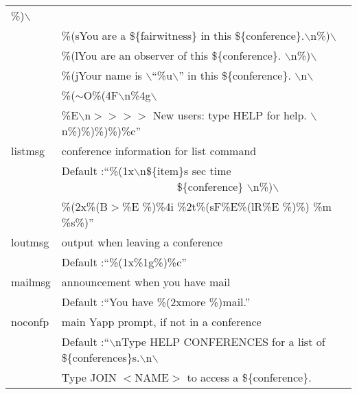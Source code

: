 \documentclass[twoside]{report}
\begin{document}
\begin{supertabular}{ll}
                 \%)$\backslash$\\
               & \hspace{1cm}\%(sYou are a \$\{fairwitness\} in this 
                 \$\{conference\}.$\backslash$n\%)$\backslash$\\
               & \hspace{1cm}\%(lYou are an observer of this \$\{conference\}.
                 $\backslash$n\%)$\backslash$\\
               & \hspace{1cm}\%(jYour name is $\backslash$``\%u$\backslash$'' 
                 in this \$\{conference\}. $\backslash$n$\backslash$\\
               & \hspace{1cm}\%($\sim$O\%(4F$\backslash$n\%4g$\backslash$\\
               & \hspace{1cm}\%E$\backslash$n$>>>>$ New users: type HELP 
                 for help.  $\backslash$n\%)\%)\%)\%)\%c''\\
            listmsg  &     conference information for list command\\
               & \hspace{1cm} Default :``\%(1x$\backslash$n\$\{item\}s sec time
                 \ \ \ \ \ \ \ \ \ \ \ \ \ \ \ \ \ \ \ \ \ \$\{conference\}
                 $\backslash$n\%)$\backslash$\\
               & \hspace{1cm}\%(2x\%(B$>$\%E \%)\%4i \%2t\%(sF\%E\%(lR\%E \%)\%) 
                 \%m \%s\%)''\\
            loutmsg  &     output when leaving a conference\\
               & \hspace{1cm} Default :``\%(1x\%1g\%)\%c''\\
            mailmsg  &     announcement when you have mail\\
               & \hspace{1cm} Default :``You have \%(2xmore \%)mail.''\\
            noconfp  &     main Yapp prompt, if not in a conference\\
               & \hspace{1cm} Default :``$\backslash$nType HELP CONFERENCES for 
                 a list of \$\{conferences\}s.$\backslash$n$\backslash$\\
               & \hspace{1cm}Type JOIN $<$NAME$>$ to access a \$\{conference\}.

\end{supertabular}
\end{document}
